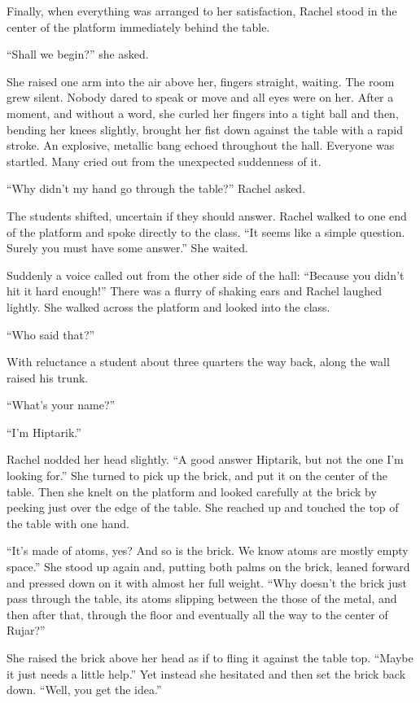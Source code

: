 Finally, when everything was arranged to her satisfaction, Rachel stood in the center of the
platform immediately behind the table.

``Shall we begin?'' she asked.

She raised one arm into the air above her, fingers straight, waiting. The room grew silent.
Nobody dared to speak or move and all eyes were on her. After a moment, and without a word, she
curled her fingers into a tight ball and then, bending her knees slightly, brought her fist down
against the table with a rapid stroke. An explosive, metallic bang echoed throughout the hall.
Everyone was startled. Many cried out from the unexpected suddenness of it.

``Why didn't my hand go through the table?'' Rachel asked.

The students shifted, uncertain if they should answer. Rachel walked to one end of the platform
and spoke directly to the class. ``It seems like a simple question. Surely you must have some
answer.'' She waited.

Suddenly a voice called out from the other side of the hall: ``Because you didn't hit it hard
enough!'' There was a flurry of shaking ears and Rachel laughed lightly. She walked across the
platform and looked into the class.

``Who said that?''

With reluctance a student about three quarters the way back, along the wall raised his trunk.

``What's your name?''

``I'm Hiptarik.''

Rachel nodded her head slightly. ``A good answer Hiptarik, but not the one I'm looking for.''
She turned to pick up the brick, and put it on the center of the table. Then she knelt on the
platform and looked carefully at the brick by peeking just over the edge of the table. She
reached up and touched the top of the table with one hand.

``It's made of atoms, yes? And so is the brick. We know atoms are mostly empty space.'' She
stood up again and, putting both palms on the brick, leaned forward and pressed down on it with
almost her full weight. ``Why doesn't the brick just pass through the table, its atoms slipping
between the those of the metal, and then after that, through the floor and eventually all the
way to the center of Rujar?''

She raised the brick above her head as if to fling it against the table top. ``Maybe it just
needs a little help.'' Yet instead she hesitated and then set the brick back down. ``Well, you
get the idea.''


